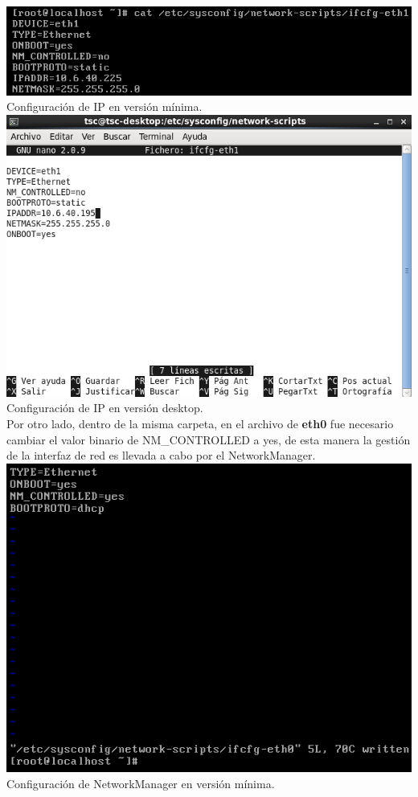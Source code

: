 \documentclass[11pt]{article}
\begin{document}
\includegraphics[width=.75\linewidth]{screenshots/minimal/cat-ifcfg-eth1.png}
    \\Configuración de IP en versión mínima.\\

\includegraphics[width=.75\linewidth]{screenshots/desktop/ifcfg-eth1.png}
    \\Configuración de IP en versión desktop.\\

Por otro lado, dentro de la misma carpeta, en el archivo de \textbf{eth0} fue necesario cambiar el valor binario de NM_CONTROLLED a yes, de esta manera la gestión de la interfaz de red es llevada a cabo por el NetworkManager.\\

\includegraphics[width=.75\linewidth]{screenshots/minimal/ifcfg-eth0(after).png}
    \\Configuración de NetworkManager en versión mínima.\\
\end{document}
